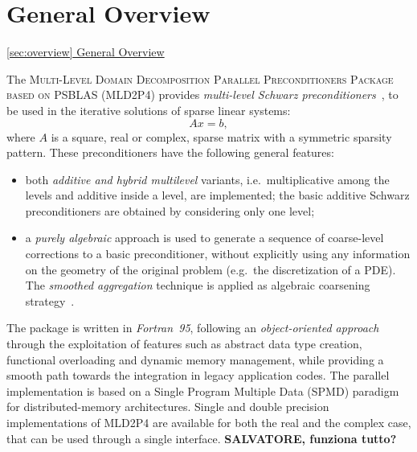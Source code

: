 \section{General Overview\label{sec:overview}}

         {\underline{\ref{sec:overview} General Overview}}

The \textsc{Multi-Level Domain Decomposition Parallel Preconditioners Package based on
PSBLAS (MLD2P4}) provides \emph{multi-level Schwarz preconditioners}~\cite{DD2},
to be used in the iterative solutions of sparse linear systems:
\begin{equation} 
Ax=b, 
\label{system1}
\end{equation} 
where $A$ is a square, real or complex, sparse matrix with a symmetric sparsity pattern.
%
%
These preconditioners have the following general features:
\begin{itemize}
\item both \emph{additive and hybrid multilevel} variants, i.e.\ multiplicative among the levels
and additive inside a level, are implemented; the basic additive Schwarz preconditioners
are obtained by considering only one level;
\item a \emph{purely algebraic} approach is used to
generate a sequence of coarse-level corrections to a basic preconditioner, without
explicitly using any information on the geometry of the original problem (e.g.\ the
discretization of a PDE). The \emph{smoothed aggregation} technique is applied
as algebraic coarsening strategy~\cite{Vanek_Mandel_Brezina,Brezina_Vanek}.
\end{itemize}

The package is written in \emph{Fortran~95}, following an \emph{object-oriented approach}
through the exploitation of features such as abstract data type creation, functional overloading and
dynamic memory management, while providing a smooth path towards the integration in
legacy application codes. The parallel implementation is based on a Single Program Multiple Data
(SPMD) paradigm for distributed-memory architectures. 
Single and double precision implementations of MLD2P4 are available for both the
real and the complex case, that can be used through a single interface.
\textbf{SALVATORE, funziona tutto?}

